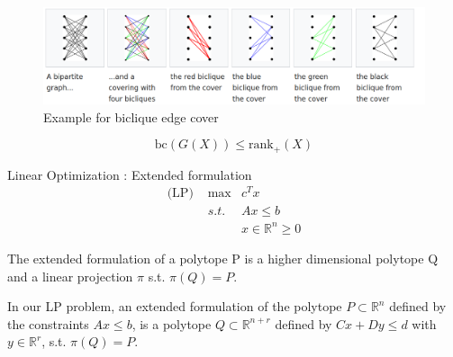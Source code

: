 \begin{frame}

\begin{figure}
\centering
\includegraphics[scale=0.2]{../images/biclique.png}
\caption{Example for biclique edge cover \cite{biclique}}
\end{figure}
\begin{thm}
\[\text{bc}(G(X))\leq \text{rank}_+(X)
\]
\end{thm}
\end{frame}

\begin{frame}{Linear Optimization : Extended formulation}
\begin{align*}
\text{(LP) } & \max & c^T x\\
 &s.t. & Ax\leq b\\
 & & x \in \mathbb{R}^n \geq 0
\end{align*}
\begin{defn}
The extended formulation of a polytope P is a higher dimensional polytope Q and a linear projection $\pi$ s.t. $\pi(Q) = P$.
\end{defn}
In our LP problem, an extended formulation of the polytope $P \subset \mathbb{R}^n$ defined by the constraints $Ax\leq b$, is a polytope $Q\subset \mathbb{R}^{n+r}$ defined by $Cx+Dy \leq d$ with $y\in \mathbb{R}^r$, s.t. $\pi(Q) = P$.

\end{frame}


